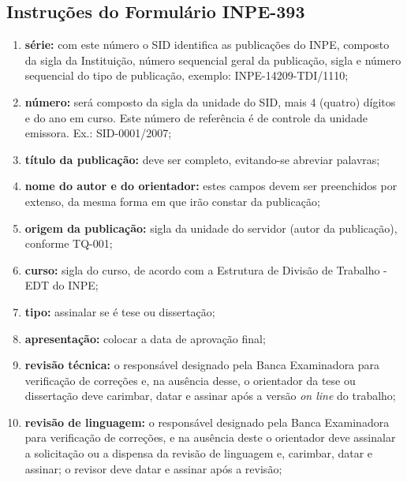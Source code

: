 \subsection{Instruções do Formulário INPE-393} 

\begin{enumerate} 

 \item \textbf{série:} com este número o SID identifica as publicações do INPE, composto da sigla da Instituição, número sequencial geral da publicação, sigla e número sequencial do tipo de publicação, exemplo: INPE-14209-TDI/1110;
 
 \item \textbf{número:} será composto da sigla da unidade do SID, mais 4 (quatro) dígitos e do ano em curso. Este número de referência é de controle da unidade emissora. Ex.: SID-0001/2007;

 \item \textbf{título da publicação:} deve ser completo, evitando-se abreviar palavras;

 \item \textbf{nome do autor e do orientador:} estes campos devem ser preenchidos por extenso, da mesma forma em que irão constar da publicação;

 \item \textbf{origem da publicação:} sigla da unidade do servidor (autor da publicação), conforme TQ-001;

 \item \textbf{curso:} sigla do curso, de acordo com a Estrutura de Divisão de Trabalho - EDT do INPE;
 
 \item \textbf{tipo:} assinalar se é tese ou dissertação;

 \item \textbf{apresentação:} colocar a data de aprovação final;

 \item \textbf{revisão técnica:} o responsável designado pela Banca Examinadora para verificação de correções e, na ausência desse, o orientador da tese ou dissertação deve
carimbar, datar e assinar após a versão \emph{on line} do trabalho;

 \item \textbf{revisão de linguagem:} o responsável designado pela Banca Examinadora para verificação de correções, e na ausência deste o orientador deve assinalar a solicitação ou a dispensa da revisão de linguagem e, carimbar, datar e assinar; o revisor deve datar e assinar após a revisão;
 

\end{enumerate}
